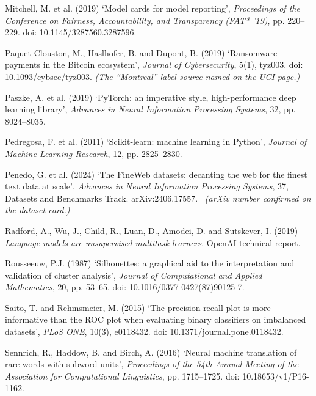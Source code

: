 \begin{references}
\item Mitchell, M. et al. (2019) ‘Model cards for model reporting’, \textit{Proceedings of the Conference on Fairness, Accountability, and Transparency (FAT* '19)}, pp. 220–229. doi: 10.1145/3287560.3287596.

\item Paquet-Clouston, M., Haslhofer, B. and Dupont, B. (2019) ‘Ransomware payments in the Bitcoin ecosystem’, \textit{Journal of Cybersecurity}, 5(1), tyz003. doi: 10.1093/cybsec/tyz003. \emph{(The ``Montreal'' label source named on the UCI page.)}

\item Paszke, A. et al. (2019) ‘PyTorch: an imperative style, high-performance deep learning library’, \textit{Advances in Neural Information Processing Systems}, 32, pp. 8024–8035.

\item Pedregosa, F. et al. (2011) ‘Scikit-learn: machine learning in Python’, \textit{Journal of Machine Learning Research}, 12, pp. 2825–2830.

\item Penedo, G. et al. (2024) ‘The FineWeb datasets: decanting the web for the finest text data at scale’, \textit{Advances in Neural Information Processing Systems}, 37, Datasets and Benchmarks Track. arXiv:2406.17557. \textdagger\ \emph{(arXiv number confirmed on the dataset card.)}

\item Radford, A., Wu, J., Child, R., Luan, D., Amodei, D. and Sutskever, I. (2019) \textit{Language models are unsupervised multitask learners}. OpenAI technical report.

\item Rousseeuw, P.J. (1987) ‘Silhouettes: a graphical aid to the interpretation and validation of cluster analysis’, \textit{Journal of Computational and Applied Mathematics}, 20, pp. 53–65. doi: 10.1016/0377-0427(87)90125-7.

\item Saito, T. and Rehmsmeier, M. (2015) ‘The precision-recall plot is more informative than the ROC plot when evaluating binary classifiers on imbalanced datasets’, \textit{PLoS ONE}, 10(3), e0118432. doi: 10.1371/journal.pone.0118432.

\item Sennrich, R., Haddow, B. and Birch, A. (2016) ‘Neural machine translation of rare words with subword units’, \textit{Proceedings of the 54th Annual Meeting of the Association for Computational Linguistics}, pp. 1715–1725. doi: 10.18653/v1/P16-1162.


\end{references}
